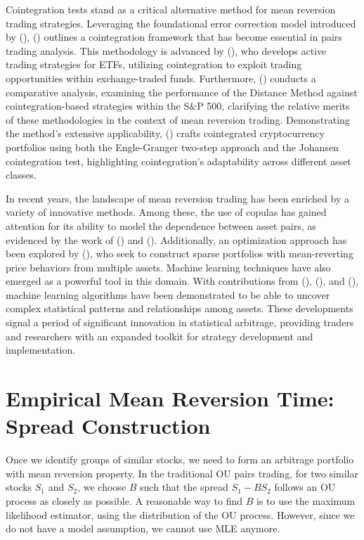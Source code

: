 \documentclass{article}
\begin{document}
Cointegration tests stand as a critical alternative method for mean reversion trading strategies. Leveraging the foundational error correction model introduced by \citeauthor{engle1987co} (\citeyear{engle1987co}), \citeauthor{vidyamurthy2004pairs} (\citeyear{vidyamurthy2004pairs}) outlines a cointegration framework that has become essential in pairs trading analysis. This methodology is advanced by \citeauthor{galenko2012trading} (\citeyear{galenko2012trading}), who develops active trading strategies for ETFs, utilizing cointegration to exploit trading opportunities within exchange-traded funds. Furthermore, \citeauthor{huck2015pairs} (\citeyear{huck2015pairs}) conducts a comparative analysis, examining the performance of the Distance Method against cointegration-based strategies within the S$\&$P 500, clarifying the relative merits of these methodologies in the context of mean reversion trading. Demonstrating the method's extensive applicability, \citeauthor{leung2019constructing} (\citeyear{leung2019constructing}) crafts cointegrated cryptocurrency portfolios using both the Engle-Granger two-step approach and the Johansen cointegration test, highlighting cointegration's adaptability across different asset classes.  

In recent years, the landscape of mean reversion trading has been enriched by a variety of innovative methods. Among these, the use of copulas has gained attention for its ability to model the dependence between asset pairs, as evidenced by the work of \citeauthor{liew2013pairs} (\citeyear{liew2013pairs}) and \citeauthor{xie2016pairs} (\citeyear{xie2016pairs}). Additionally, an optimization approach has been explored by \citeauthor{zhang2020sparse} (\citeyear{zhang2020sparse}), who seek to construct sparse portfolios with mean-reverting price behaviors from multiple assets. Machine learning techniques have also emerged as a powerful tool in this domain. With contributions from \citeauthor{guijarro2021deep} (\citeyear{guijarro2021deep}), \citeauthor{sarmento2020enhancing} (\citeyear{sarmento2020enhancing}), and \citeauthor{chang2021pairs} (\citeyear{chang2021pairs}), machine learning algorithms have been demonstrated to be able to uncover complex statistical patterns and relationships among assets. These developments signal a period of significant innovation in statistical arbitrage, providing traders and researchers with an expanded toolkit for strategy development and implementation.

\section{Empirical Mean Reversion Time: Spread Construction}
\label{sec3}
Once we identify groups of similar stocks, we need to form an arbitrage portfolio with mean reversion property. In the traditional OU pairs trading, for two similar stocks $S_1$ and $S_2$, we choose $B$ such that the spread $S_1- B S_2$ follows an OU process as closely as possible. A reasonable way to find $B$ is to use the maximum likelihood estimator, using the distribution of the OU process. However, since we do not have a model assumption, we cannot use MLE anymore.
\end{document}
